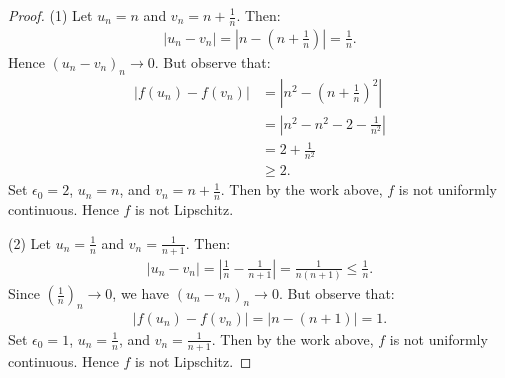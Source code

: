 \documentclass[11pt,twoside,openany]{memoir}
\begin{document}
        \begin{proof}
            (1) Let $u_n = n$ and $v_n = n+\frac{1}{n}$. Then:
                \begin{equation*}
                \begin{split}
                    |u_n - v_n| = \left|n - \left(n + \frac{1}{n}\right)\right| = \frac{1}{n}.
                \end{split}
                \end{equation*}
            Hence $(u_n - v_n)_n \rightarrow 0$. But observe that:
                \begin{equation*}
                \begin{split}
                    |f(u_n) - f(v_n)|
                    & = \left|n^2 - \left(n + \frac{1}{n}\right)^2\right| \\
                    & = \left|n^2 - n^2 - 2 - \frac{1}{n^2}\right| \\
                    & = 2 + \frac{1}{n^2} \\
                    & \geq 2.
                \end{split}
                \end{equation*}
            Set $\epsilon_0 = 2$, $u_n = n$, and $v_n = n + \frac{1}{n}$. Then by the work above, $f$ is not uniformly continuous. Hence $f$ is not Lipschitz. \nl
            
            
            (2) Let $u_n = \frac{1}{n}$ and $v_n = \frac{1}{n+1}$. Then:
                \begin{equation*}
                \begin{split}
                    |u_n - v_n| = \left|\frac{1}{n} - \frac{1}{n+1}\right| = \frac{1}{n(n+1)} \leq \frac{1}{n}.
                \end{split}
                \end{equation*}
            Since $\left(\frac{1}{n}\right)_n \rightarrow 0$, we have $(u_n - v_n)_n \rightarrow 0$. But observe that:
                \begin{equation*}
                \begin{split}
                    |f(u_n) - f(v_n)| = |n - (n+1)| = 1. 
                \end{split}
                \end{equation*}
            Set $\epsilon_0 = 1$, $u_n = \frac{1}{n}$, and $v_n = \frac{1}{n+1}$. Then by the work above, $f$ is not uniformly continuous. Hence $f$ is not Lipschitz.
        \end{proof}
\end{document}
